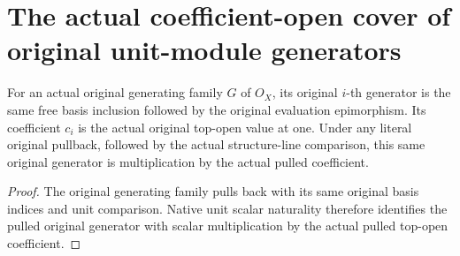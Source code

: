 \section{The actual coefficient-open cover of original unit-module generators}

\begin{definition}
\label{def:fc-original-generator-coefficient-opens}
\leanok
{}
For an actual original generating family $G$ of $O_X$, its original
$i$-th generator is the same free basis inclusion followed by the
original evaluation epimorphism. Its coefficient $c_i$ is the actual
original top-open value at one. Under any literal original pullback,
followed by the actual structure-line comparison, this same original
generator is multiplication by the actual pulled coefficient.
\end{definition}
\begin{proof}
The original generating family pulls back with its same original
basis indices and unit comparison. Native unit scalar naturality
therefore identifies the pulled original generator with scalar
multiplication by the actual pulled top-open coefficient.
\end{proof}

